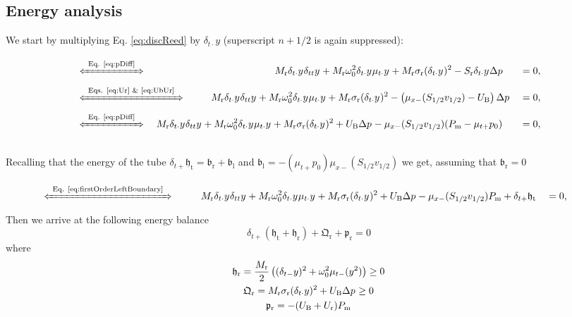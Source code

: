 \documentclass[dvipsnames]{article}
\def\mystrut{\rule[-.2\baselineskip]{0pt}{\baselineskip}}
\def\dtd{\delta_{t\cdot}}
\begin{document}
\subsection{Energy analysis}
We start by multiplying Eq. \eqref{eq:discReed} by $\delta_{t\cdot}y$ (superscript $n+1/2$ is again suppressed):
\begin{alignat}{2}
    &\xLeftrightarrow{\mystrut\ \text{Eq. \eqref{eq:pDiff}}\ }\qquad\qquad\qquad\qquad\qquad\qquad\quad M_\text{r}\delta_{t\cdot}y^{\nph}\delta_{tt}y^{\nph} + M_\text{r}\omega_0^2\delta_{t\cdot}y^{\nph}\mu_{t\cdot}y^{\nph} + M_\text{r} \sigma_\text{r}(\delta_{t\cdot}y^{\nph})^2 - S_\text{r}\delta_{t\cdot}y^{\nph}\Delta p^{\nph} &&= 0,\nonumber\\[-5pt]
    &\xLeftrightarrow{\mystrut\ \text{Eqs. \eqref{eq:Ur} \& \eqref{eq:UbUr}}\ } \qquad \ \: M_\text{r}\delta_{t\cdot}y^{\nph}\delta_{tt}y^{\nph} + M_\text{r}\omega_0^2\delta_{t\cdot}y^{\nph}\mu_{t\cdot}y^{\nph} + M_\text{r} \sigma_\text{r}(\delta_{t\cdot}y^{\nph})^2 - \left(\mu_{x-}(S_{1/2}v_{1/2})-U_\text{B}\right)\Delta p^{\nph} &&= 0,\nonumber\\[-5pt]
    &\xLeftrightarrow{\mystrut\ \text{Eq. \eqref{eq:pDiff}}\ } \quad M_\text{r}\delta_{t\cdot}y^{\nph}\delta_{tt}y^{\nph} + M_\text{r}\omega_0^2\delta_{t\cdot}y^{\nph}\mu_{t\cdot}y^{\nph} + M_\text{r} \sigma_\text{r}(\delta_{t\cdot}y^{\nph})^2 + U_\text{B}\Delta p^{\nph}-\mu_{x-}(S_{1/2}v_{1/2})(P_\text{m} - \mu_{t+}p_0) &&= 0,\nonumber
\end{alignat}
\vspace{-5pt}\\
Recalling that the energy of the tube $\delta_{t+}\mathfrak{h}_\text{t} = \mathfrak{b}_\text{r} + \mathfrak{b}_\text{l}$ and $\mathfrak{b}_\text{l} = -(\mu_{t+}p_0)\mu_{x-}(S_{1/2}v_{1/2})$ we get, assuming that $\mathfrak{b}_\text{r} = 0$\vspace{-5pt}
\begin{alignat}{2}
    &\xLeftrightarrow{\mystrut\ \text{Eq. \eqref{eq:firstOrderLeftBoundary}}\ }\qquad\ \  M_\text{r}\delta_{t\cdot}y^{\nph}\delta_{tt}y^{\nph} + M_\text{r}\omega_0^2\delta_{t\cdot}y^{\nph}\mu_{t\cdot}y^{\nph} + M_\text{r} \sigma_\text{r}(\delta_{t\cdot}y^{\nph})^2 + U_\text{B}\Delta p^{\nph}-\mu_{x-}(S_{1/2}v_{1/2})P_\text{m} + \delta_{t+}\mathfrak{h}_\text{t} &&= 0,\nonumber
\end{alignat}
Then we arrive at the following energy balance
\begin{equation}
    \delta_{t+}\left(\mathfrak{h}_\text{t}+\mathfrak{h}_\text{r}\right) + \mathfrak{Q}_\text{r} + \mathfrak{p}_\text{r} = 0
\end{equation}
where
\begin{gather}
    \mathfrak{h}_\text{r} = \frac{M_\text{r}}{2}\left((\delta_{t-}y)^2+\omega_0^2\mu_{t-}(y^2)\right) \geq 0\\
    \mathfrak{Q}_\text{r} = M_\text{r}\sigma_\text{r}(\dtd y)^2 + U_\text{B}\Delta p^{\nph} \geq 0\\
    \mathfrak{p}_\text{r} = -(U_\text{B} + U_\text{r})P_\text{m}
\end{gather}
\end{document}
